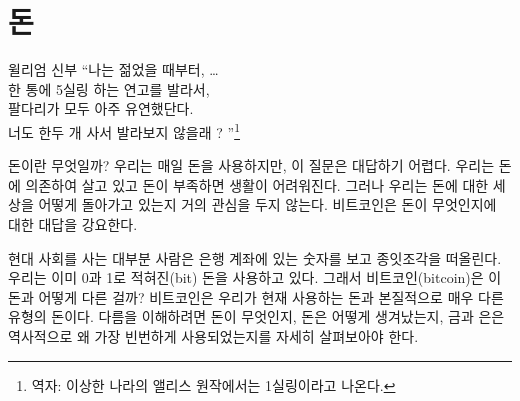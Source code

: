 \chapter{돈}
\label{les:11}

\begin{chapquote}{윌리엄 신부}
	\enquote{나는 젊었을 때부터, \ldots \\
		한 통에 5실링 하는 연고를 발라서, \\
		팔다리가 모두 아주 유연했단다. \\
		너도 한두 개 사서 발라보지 않을래 ?
	}\footnote{역자: 이상한 나라의 앨리스 원작에서는 1실링이라고 나온다.}
\end{chapquote}


\begin{comment}
	What is money? We use it every day, yet this question is surprisingly
	difficult to answer. We are dependent on it in ways big and small, and
	if we have too little of it our lives become very difficult. Yet, we
	seldom think about the thing which supposedly makes the world go round.
	Bitcoin forced me to answer this question over and over again: What the
	hell is money?
\end{comment}
돈이란 무엇일까? 
우리는 매일 돈을 사용하지만, 이 질문은 대답하기 어렵다. 
우리는 돈에 의존하여 살고 있고 돈이 부족하면 생활이 어려워진다. 
그러나 우리는 돈에 대한 세상을 어떻게 돌아가고 있는지 거의 관심을 두지 않는다.
비트코인은 돈이 무엇인지에 대한 대답을 강요한다.

\begin{comment}
	In our \enquote{modern} world, most people will probably think of pieces of
	paper when they talk about money, even though most of our money is just
	a number in a bank account. We are already using zeros and ones as our
	money, so how is Bitcoin different? Bitcoin is different because at its
	core it is a very different \textit{type} of money than the money we currently
	use. To understand this, we will have to take a closer look at what
	money is, how it came to be, and why gold and silver was used for most
	of commercial history.
\end{comment}
현대 사회를 사는 대부분 사람은 은행 계좌에 있는 숫자를 보고 종잇조각을 떠올린다.
우리는 이미 0과 1로 적혀진(bit) 돈을 사용하고 있다. 
그래서 비트코인(bitcoin)은 이 돈과 어떻게 다른 걸까?
비트코인은 우리가 현재 사용하는 돈과 본질적으로 매우 다른 유형의 돈이다. 
다름을 이해하려면 돈이 무엇인지, 돈은 어떻게 생겨났는지, 
금과 은은 역사적으로 왜 가장 빈번하게 사용되었는지를
자세히 살펴보아야 한다.

